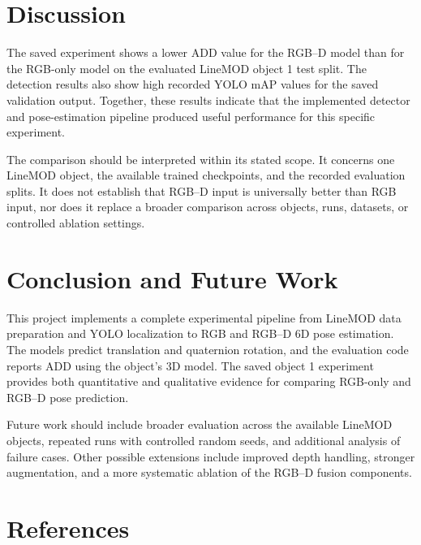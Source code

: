 \documentclass[11pt,a4paper]{article}
\begin{document}


\section{Discussion}

The saved experiment shows a lower ADD value for the RGB--D model than for the
RGB-only model on the evaluated LineMOD object 1 test split. The detection
results also show high recorded YOLO mAP values for the saved validation
output. Together, these results indicate that the implemented detector and
pose-estimation pipeline produced useful performance for this specific
experiment.

The comparison should be interpreted within its stated scope. It concerns one
LineMOD object, the available trained checkpoints, and the recorded evaluation
splits. It does not establish that RGB--D input is universally better than RGB
input, nor does it replace a broader comparison across objects, runs, datasets,
or controlled ablation settings.


\section{Conclusion and Future Work}

This project implements a complete experimental pipeline from LineMOD data
preparation and YOLO localization to RGB and RGB--D 6D pose estimation. The
models predict translation and quaternion rotation, and the evaluation code
reports ADD using the object's 3D model. The saved object 1 experiment provides
both quantitative and qualitative evidence for comparing RGB-only and RGB--D
pose prediction.

Future work should include broader evaluation across the available LineMOD
objects, repeated runs with controlled random seeds, and additional analysis of
failure cases. Other possible extensions include improved depth handling,
stronger augmentation, and a more systematic ablation of the RGB--D fusion
components.


\section*{References}

\end{document}

